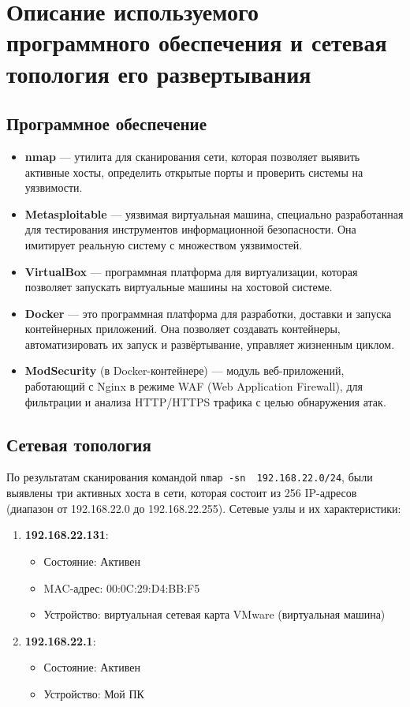 \graphicspath{{./img/}}
\section{Описание используемого программного обеспечения
	и сетевая топология его развертывания}

\subsection{Программное обеспечение}

\begin{itemize}
	\item \textbf{nmap} --- утилита для сканирования сети,
		которая позволяет выявить активные хосты,
		определить открытые порты и проверить системы на уязвимости.
	\item \textbf{Metasploitable} --- уязвимая виртуальная машина,
		специально разработанная
		для тестирования инструментов информационной безопасности.
		Она имитирует реальную систему с множеством уязвимостей.
	\item \textbf{VirtualBox} --- программная платформа для виртуализации,
		которая позволяет запускать виртуальные машины на хостовой системе.
	\item \textbf{Docker} --- это программная платформа для разработки,
		доставки и запуска контейнерных приложений.
		Она позволяет создавать контейнеры,
		автоматизировать их запуск и развёртывание,
		управляет жизненным циклом.
	\item \textbf{ModSecurity} (в Docker-контейнере) --- модуль веб-приложений,
		работающий с Nginx в режиме WAF (Web Application Firewall),
		для фильтрации и анализа HTTP/HTTPS трафика с целью обнаружения атак.
\end{itemize}

\subsection{Сетевая топология}

По результатам сканирования командой
\verb|nmap -sn  192.168.22.0/24|,
были выявлены три активных хоста в сети,
которая состоит из 256 IP-адресов
(диапазон от 192.168.22.0 до 192.168.22.255).
Сетевые узлы и их характеристики:

\begin{enumerate}
	\item \textbf{192.168.22.131}:
	\begin{itemize}
		\item Состояние: Активен
		\item MAC-адрес: 00:0C:29:D4:BB:F5
		\item Устройство:
			виртуальная сетевая карта VMware
			(виртуальная машина)
	\end{itemize}
	\item \textbf{192.168.22.1}:
	\begin{itemize}
		\item Состояние: Активен
		\item Устройство: Мой ПК
	\end{itemize}
\end{enumerate}

